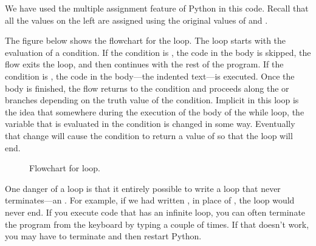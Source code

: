 \documentclass[letterpaper,10pt,english]{sphinxmanual}
\begin{document}
\begin{sphinxVerbatim}[commandchars=\\\{\}]
    
   
        
\end{sphinxVerbatim}

\sphinxAtStartPar
We have used the multiple assignment feature of Python in this code.  Recall that all the values on the left are assigned using the original values of  and .

\sphinxAtStartPar
The figure below shows the flowchart for the  loop.  The loop starts with the evaluation of a condition.  If the condition is , the code in the body is skipped, the flow exits the loop, and then continues with the rest of the program.  If the condition is , the code in the body—the indented text—is executed.  Once the body is finished, the flow returns to the condition and proceeds along the  or  branches depending on the truth value of the condition.  Implicit in this loop is the idea that somewhere during the execution of the body of the while loop, the variable that is evaluated in the condition is changed in some way.  Eventually that change will cause the condition to return a value of  so that the loop will end.

\begin{figure}[htbp]
\centering
\capstart

\noindent{}
\caption{Flowchart for  loop.}\label{\detokenize{chap6/chap6_loopsconds:id5}}\label{\detokenize{chap6/chap6_loopsconds:fig-flow-while}}\end{figure}

\sphinxAtStartPar
One danger of a  loop is that it entirely possible to write a loop that never terminates—an .  For example, if we had written , in place of , the loop would never end.  If you execute code that has an infinite loop, you can often terminate the program from the keyboard by typing  a couple of times.  If that doesn’t work, you may have to terminate and then restart Python.
\end{document}
